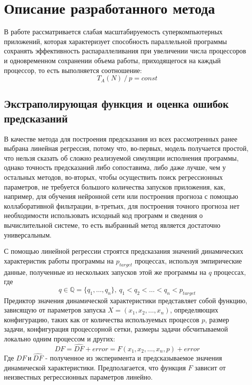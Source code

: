 \section{Описание разработанного метода}
	В работе рассматривается слабая масштабируемость суперкомпьютерных приложений, которая характеризует способность параллельной программы сохранять эффективность распараллеливания при увеличении числа процессоров и одновременном сохранении объема работы, приходящегося на каждый процессор, то есть выполняется соотношение:
	\begin{equation}\label{weak_sc}
	T_A(N)\:/\:p = const
	\end{equation}

	\subsection{Экстраполирующая функция и оценка ошибок предсказаний}
		В качестве метода для построения предсказания из всех рассмотренных ранее выбрана линейная регрессия, потому что, во-первых, модель получается простой, что нельзя сказать об сложно реализуемой симуляции исполнения программы,
		однако точность предсказаний либо сопоставима, либо даже лучше, чем у остальных методов, во-вторых, чтобы осуществить поиск регрессионных параметров, не требуется большого количества запусков приложения, как, например, для обучения нейронной сети или построения прогноза с помощью коллаборативной фильтрации, в-третьих, для построения точного прогноза нет необходимости использовать исходный код программ и сведения о вычислительной системе, то есть выбранный метод является достаточно универсальным.%

		С помощью линейной регрессии строятся предсказания значений динамических характеристик работы программы на \(p_{target}\) процессах, используя эмпирические данные, полученные из нескольких запусков этой же программы на \(q\) процессах, где
		\[q \in \mathbb{Q} = \{q_1,\ldots, q_n\},\ q_1 < q_2 < \ldots < q_n < p_{target}\]
		Предиктор значения динамической характеристики представляет собой функцию, зависящую от параметров запуска \(X = (x_1, x_2, \ldots, x_n)\), определяющих конфигурацию, таких как от количества используемых процессов \(p\), размер задачи, конфигурация процессорной сетки, размеры задачи обсчитываемой локально одним процессом и других:
		\begin{equation}\label{main_formula}
		DF = \hat{DF} + error = F(x_1, x_2, \ldots, x_n, p) + error
		\end{equation}
		Где \(DF\ и\ \hat{DF}\) - полученное из эксперимента и предсказываемое значения динамической характеристики. Предполагается, что функция \(F\) зависит от неизвестных регрессионных параметров линейно.

